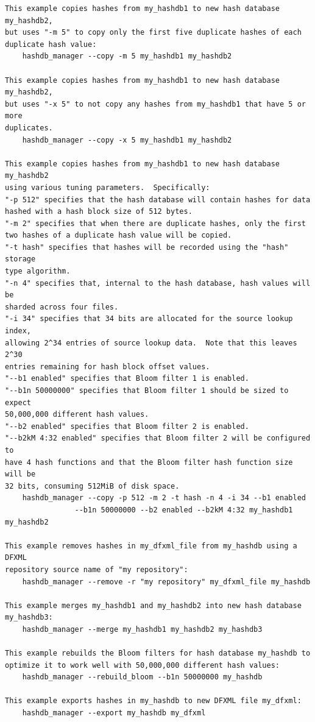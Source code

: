 \documentclass[11pt,twoside]{article}
\begin{document}
\begin{small}
\begin{verbatim}
This example copies hashes from my_hashdb1 to new hash database my_hashdb2,
but uses "-m 5" to copy only the first five duplicate hashes of each
duplicate hash value:
    hashdb_manager --copy -m 5 my_hashdb1 my_hashdb2

This example copies hashes from my_hashdb1 to new hash database my_hashdb2,
but uses "-x 5" to not copy any hashes from my_hashdb1 that have 5 or more
duplicates.
    hashdb_manager --copy -x 5 my_hashdb1 my_hashdb2

This example copies hashes from my_hashdb1 to new hash database my_hashdb2
using various tuning parameters.  Specifically:
"-p 512" specifies that the hash database will contain hashes for data
hashed with a hash block size of 512 bytes.
"-m 2" specifies that when there are duplicate hashes, only the first
two hashes of a duplicate hash value will be copied.
"-t hash" specifies that hashes will be recorded using the "hash" storage
type algorithm.
"-n 4" specifies that, internal to the hash database, hash values will be
sharded across four files.
"-i 34" specifies that 34 bits are allocated for the source lookup index,
allowing 2^34 entries of source lookup data.  Note that this leaves 2^30
entries remaining for hash block offset values.
"--b1 enabled" specifies that Bloom filter 1 is enabled.
"--b1n 50000000" specifies that Bloom filter 1 should be sized to expect
50,000,000 different hash values.
"--b2 enabled" specifies that Bloom filter 2 is enabled.
"--b2kM 4:32 enabled" specifies that Bloom filter 2 will be configured to
have 4 hash functions and that the Bloom filter hash function size will be
32 bits, consuming 512MiB of disk space.
    hashdb_manager --copy -p 512 -m 2 -t hash -n 4 -i 34 --b1 enabled
                --b1n 50000000 --b2 enabled --b2kM 4:32 my_hashdb1 my_hashdb2

This example removes hashes in my_dfxml_file from my_hashdb using a DFXML
repository source name of "my repository":
    hashdb_manager --remove -r "my repository" my_dfxml_file my_hashdb

This example merges my_hashdb1 and my_hashdb2 into new hash database
my_hashdb3:
    hashdb_manager --merge my_hashdb1 my_hashdb2 my_hashdb3

This example rebuilds the Bloom filters for hash database my_hashdb to
optimize it to work well with 50,000,000 different hash values:
    hashdb_manager --rebuild_bloom --b1n 50000000 my_hashdb

This example exports hashes in my_hashdb to new DFXML file my_dfxml:
    hashdb_manager --export my_hashdb my_dfxml


\end{verbatim}
\end{small}
\end{document}
